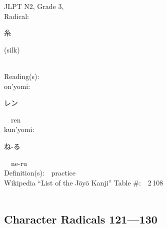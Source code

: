 \begin{multicols}{2}
{JLPT N2, Grade 3, \\Radical:\ \ {\begin{CJK}{UTF8}{min} 糸 \end{CJK}} (silk) } \\
Reading(s):\ \ \\
{\hspace*{1em}}on'yomi:\ \ \\
{\hspace*{2em}}{\begin{CJK}{UTF8}{min} レン \end{CJK}}\ \ ren\ \ \\
{\hspace*{1em}}kun'yomi:\ \ \\
{\hspace*{2em}}{\begin{CJK}{UTF8}{min} ね-る \end{CJK}}\ \ ne-ru\ \ \\
Definition(s):\ \ practice \\
Wikipedia ``List of the J\=oy\=o Kanji'' Table \#:\ \ 2\,108 \\
\ \ \\
\end{multicols}



\newpage



\subsection*{Character Radicals 121---130 }
  \label{P3-S14}

